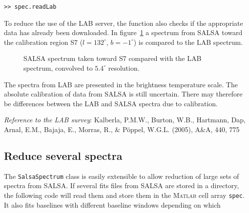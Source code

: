 \documentclass[11pt,a4paper]{article}
\begin{document}
\begin{lstlisting}
>> spec.readLab
\end{lstlisting}

To reduce the use of the LAB server, the function also checks if the
appropriate data has already been downloaded. In figure~\ref{fig:lab}
a spectrum from SALSA toward the calibration region S7
($l=132^{\circ}$, $b=-1^{\circ}$) is compared to the LAB spectrum.

\begin{figure}[h]
  \centering
  \caption{SALSA spectrum taken toward S7 compared with the LAB
    spectrum, convolved to $5.4^{\circ}$ resolution.}
  \label{fig:lab}
\end{figure}

The spectra from LAB are presented in the brightness temperature
scale. The absolute calibration of data from SALSA is still
uncertain. There may therefore be differences between the LAB and
SALSA spectra due to calibration. 

\emph{Reference to the LAB survey}: Kalberla, P.M.W., Burton, W.B.,
Hartmann, Dap, Arnal, E.M., Bajaja, E., Morras, R., \& P\"{o}ppel,
W.G.L. (2005), A\&A, 440, 775


\subsection{Reduce several spectra}
\label{sec:reduce-sever-spectra}

The \texttt{SalsaSpectrum} class is easily extensible to allow
reduction of large sets of spectra from SALSA. If several fits files
from SALSA are stored in a directory, the following code will read
them and store them in the \textsc{Matlab} cell array \texttt{spec}. It also
fits baselines with different baseline windows depending on which 
\end{document}
